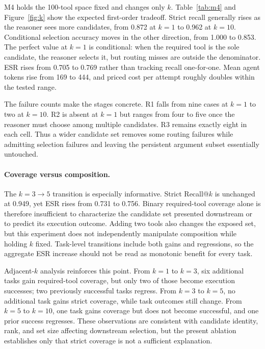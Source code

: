 \documentclass[10pt,twocolumn]{article}
\begin{document}
M4 holds the 100-tool space fixed and changes only $k$. Table~\ref{tab:m4} and Figure~\ref{fig:k} show the expected first-order tradeoff. Strict recall generally rises as the reasoner sees more candidates, from 0.872 at $k=1$ to 0.962 at $k=10$. Conditional selection accuracy moves in the other direction, from 1.000 to 0.853. The perfect value at $k=1$ is conditional: when the required tool is the sole candidate, the reasoner selects it, but routing misses are outside the denominator. ESR rises from 0.705 to 0.769 rather than tracking recall one-for-one. Mean agent tokens rise from 169 to 444, and priced cost per attempt roughly doubles within the tested range.

The failure counts make the stages concrete. R1 falls from nine cases at $k=1$ to two at $k=10$. R2 is absent at $k=1$ but ranges from four to five once the reasoner must choose among multiple candidates. R3 remains exactly eight in each cell. Thus a wider candidate set removes some routing failures while admitting selection failures and leaving the persistent argument subset essentially untouched.

\paragraph{Coverage versus composition.}
The $k=3\rightarrow5$ transition is especially informative. Strict Recall@$k$ is unchanged at 0.949, yet ESR rises from 0.731 to 0.756. Binary required-tool coverage alone is therefore insufficient to characterize the candidate set presented downstream or to predict its execution outcome. Adding two tools also changes the exposed set, but this experiment does not independently manipulate composition while holding $k$ fixed. Task-level transitions include both gains and regressions, so the aggregate ESR increase should not be read as monotonic benefit for every task.

Adjacent-$k$ analysis reinforces this point. From $k=1$ to $k=3$, six additional tasks gain required-tool coverage, but only two of those become execution successes; two previously successful tasks regress. From $k=3$ to $k=5$, no additional task gains strict coverage, while task outcomes still change. From $k=5$ to $k=10$, one task gains coverage but does not become successful, and one prior success regresses. These observations are consistent with candidate identity, rank, and set size affecting downstream selection, but the present ablation establishes only that strict coverage is not a sufficient explanation.
\end{document}
